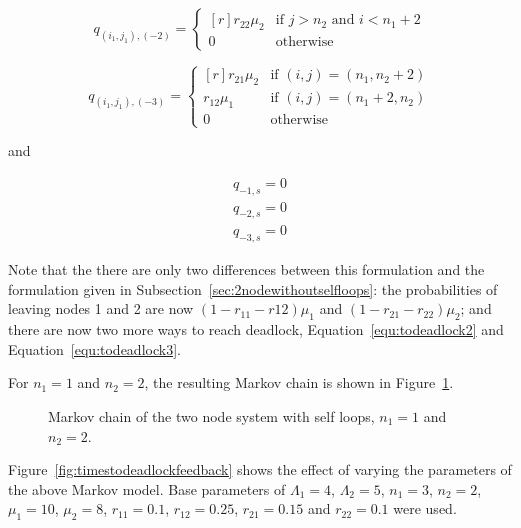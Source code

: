 \documentclass{article}
\begin{document}
\begin{equation}\label{equ:todeadlock3}
  q_{(i_1, j_1), (-2)} = \left\{
  \begin{matrix*}[ r ]
    r_{22}\mu_2 & \text{if } j > n_2 \text{ and } i < n_1 + 2 \\
    0 & \text{otherwise}
  \end{matrix*}
  \right.
\end{equation}

\begin{equation}
  q_{(i_1, j_1), (-3)} = \left\{
  \begin{matrix*}[ r ]
    r_{21}\mu_2 & \text{if } (i, j) = (n_1, n_2 + 2) \\
    r_{12}\mu_1 & \text{if } (i, j) = (n_1 + 2, n_2) \\
    0 & \text{otherwise}
  \end{matrix*}
  \right.
\end{equation}

and

\begin{align}
  q_{-1, s} = 0 \\
  q_{-2, s} = 0 \\
  q_{-3, s} = 0
\end{align}

Note that the there are only two differences between this formulation and the formulation given in Subsection~\ref{sec:2nodewithoutselfloops}: the probabilities of leaving nodes 1 and 2 are now $(1-r_{11}-r{12})\mu_1$ and $(1-r_{21}-r_{22})\mu_2$; and there are now two more ways to reach deadlock, Equation~\ref{equ:todeadlock2} and Equation~\ref{equ:todeadlock3}.

For $n_1 = 1$ and $n_2 = 2$, the resulting Markov chain is shown in Figure~\ref{fig:2nodeMCfeedback}.

\begin{figure}[H]
    
    \caption{Markov chain of the two node system with self loops, $n_1=1$ and $n_2=2$.}
    \label{fig:2nodeMCfeedback}
\end{figure}

Figure~\ref{fig:timestodeadlockfeedback} shows the effect of varying the parameters of the above Markov model.
Base parameters of $\Lambda_1 = 4$, $\Lambda_2 = 5$, $n_1 = 3$, $n_2 = 2$, $\mu_1 = 10$, $\mu_2 = 8$, $r_{11} = 0.1$, $r_{12} = 0.25$, $r_{21} = 0.15$ and $r_{22} = 0.1$ were used.
\end{document}
